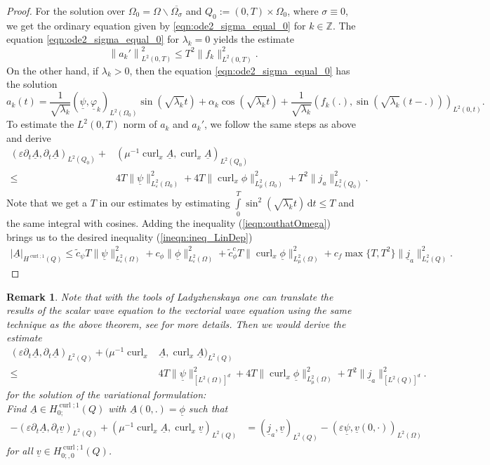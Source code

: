 \documentclass[a4paper,11pt]{article}
\newtheorem{rmk}[thm]{Remark}
\newcommand{\Z}{\mathbb Z}
\newcommand{\intT}{\int\limits_{0}^T}
\newcommand{\omsig}{\Omega_{\sigma}}
\newcommand{\cu}{\operatorname{curl}}
\renewcommand{\vec}[1]{\underline{#1}}
\newcommand{\norm}[1]{{\left\lVert{#1}\right\rVert}}
\begin{document}
\begin{proof}
	For the solution over $\Omega_0 = \Omega\backslash\overline{\omsig}$ and $Q_0:=(0,T)\times\Omega_0 $, where $\sigma \equiv 0$,  we get the ordinary equation  given by  \eqref{eqn:ode2_sigma_equal_0} for $k \in \Z$.  The equation \eqref{eqn:ode2_sigma_equal_0} for $\lambda_k =0$ yields the estimate  
		\[\norm{ {a_k}'}_{L^2(0,T)}^2 \leq T^2 \|f_k\|^2_{L^2(0,T)}. \]
		On the other hand, if $\lambda_k >0$, then the equation  \eqref{eqn:ode2_sigma_equal_0} has the solution
	\[
	 {a_k}(t) = \frac{1}{\sqrt{\lambda_k}}(\vec \psi,\vec \varphi_k)_{L^2(\Omega_0)}\sin(\sqrt{\lambda_k}t) + \alpha_k\cos(\sqrt{\lambda_k}t) + \frac{1}{\sqrt{\lambda_k}} {(f_k(.),\sin(\sqrt{\lambda_k}(t-.)))_{L^2(0,t)}}.
	\]
	To estimate the $L^2(0,T)$ norm of $ a_k$ and $ a_k'$, we follow the same steps as above and derive
	\begin{align}
		\label{ieqn:outhatOmega}
		(\varepsilon\partial_t \vec A, \partial_t \vec A)_{L^2(Q_0)}+&(\mu^{-1}\cu_x  \vec A,\cu_x  \vec A)_{L^2(Q_0)} \\
		\nonumber
		\leq&	4T\|\vec \psi\|_{L^2_{\varepsilon}(\Omega_0)}^2 +4T\|\cu_x \phi\|^2_{L^2_{\mu}(\Omega_0)} +  T^2\|j_a\|^2_{L^2_\varepsilon(Q_0)}.
	\end{align}
	Note that we get a $T$ in our estimates by estimating $\intT \sin^2(\sqrt{\lambda_k}t)\,\mathrm dt \leq T$ and the same integral with cosines.
	Adding the inequality (\ref{ieqn:outhatOmega}) brings us to the desired inequality (\ref{ineqn:ineq_LinDep})
	\begin{align*}
		| \vec A |_{H^{\cu;1}(Q)}	\leq \tilde{c}_\psi T\|\vec \psi\|^2_{L^2_{\varepsilon}({\Omega})}  +c_\phi\|\vec \phi\|^2_{L^2_{\varepsilon}({\Omega})} +\tilde{c}_\phi^cT \|\cu_x\vec \phi\|^2_{L^2_{\mu}({\Omega})} + c_f \max\{T,T^2\} \|\vec j_a\|^2_{L^2_{\varepsilon}({Q})}.
	\end{align*}
\end{proof}

\begin{rmk}
	Note that with the tools of Ladyzhenskaya \cite[Thm.~3.2, p.~160]{Ladyzhenskaya1985} one can translate the results of the scalar wave equation to the vectorial wave equation using the same technique as the above theorem, see \cite{HauserDiss2021} for more details. Then we would derive the estimate
	\begin{align}
		\label{eqn:ladyschenskaya_absch}
		(\varepsilon\partial_t \vec A, \partial_t \vec A)_{L^2(Q)}+(\mu^{-1}\cu_x &\vec A,\cu_x  \vec A)_{L^2(Q)} \\
		\nonumber
		\leq&	4T\|\vec \psi\|_{[L^2(\Omega)]^d}^2 +4T\|\cu_x \vec \phi\|^2_{L^2_{\mu}(\Omega)} +  T^2\|\vec j_a\|^2_{[L^2(Q)]^d}.
	\end{align}
	for the solution of the variational formulation:\\
	Find $ \vec A\in H^{\cu;1}_{0;} (Q) $ with $\vec A(0,.) = \vec \phi$ such that
	\begin{align*}
		-(\varepsilon\partial_t \vec A,\partial_t \vec v)_{L^2(Q)}+ (\mu^{-1}	\cu_x  \vec A,\cu_x \vec v)_{L^2(Q)} &= (\vec j_a, \vec v)_{L^2(Q)} -(\varepsilon	\vec \psi,\vec v(0,\cdot))_{L^2(\Omega)}
	\end{align*}
	for all $\vec v\in H^{\cu;1}_{0;,0}(Q) $. 
\end{rmk}
\end{document}
